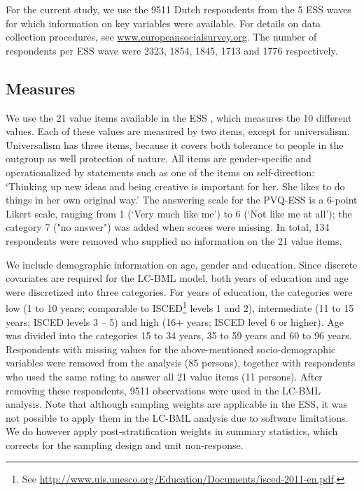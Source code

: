 \documentclass[12pt,letter]{article}\usepackage[]{graphicx}\usepackage[]{xcolor}
\begin{document}
For the current study, we use the 9511 Dutch respondents from the 5 ESS waves for which information on key variables were available. For details on data collection procedures, see \url{www.europeansocialsurvey.org}. The number of respondents per ESS wave were 2323, 1854, 1845, 1713 and 1776 respectively.

\subsection*{Measures} 




We use the 21 value items available in the ESS \citep[Schwartz Portrait Values Questionnaire, PVQ21;][]{schwartz2001,schwartz2007}, which measures the 10 different values. Each of these values are measured by two items, except for universalism. Universalism has three items, because it covers both tolerance to people in the outgroup as well protection of nature. All items are gender-specific and operationalized by statements such as one of the items on self-direction: `Thinking up new ideas and being creative is important for her. She likes to do things in her own original way.' The answering scale for the PVQ-ESS is a 6-point Likert scale, ranging from 1 (`Very much like me') to 6 (`Not like me at all'); the category 7 ("no answer") was added when scores were missing. In total, 134 respondents were removed who supplied no information on the 21 value items.

We include demographic information on age, gender and education. Since discrete covariates are required for the LC-BML model, both years of education and age were discretized into three categories. For years of education, the categories were low (1 to 10 years; comparable to ISCED\footnote{See \url{http://www.uis.unesco.org/Education/Documents/isced-2011-en.pdf}.} levels 1 and 2), intermediate (11 to 15 years; ISCED levels 3 -- 5) and high (16+ years; ISCED level 6 or higher). Age was divided into the categories 15 to 34 years, 35 to 59 years and 60 to 96 years. Respondents with missing values for the above-mentioned socio-demographic variables were removed from the analysis (85 persons), together with respondents who used the same rating to answer all 21 value items (11 persons). After removing these respondents, 9511 observations were used in the LC-BML analysis. Note that although sampling weights are applicable in the ESS, it was not possible to apply them in the LC-BML analysis due to software limitations. We do however apply post-stratification weights in summary statistics, which corrects for the sampling design and unit non-response. 
\end{document}
